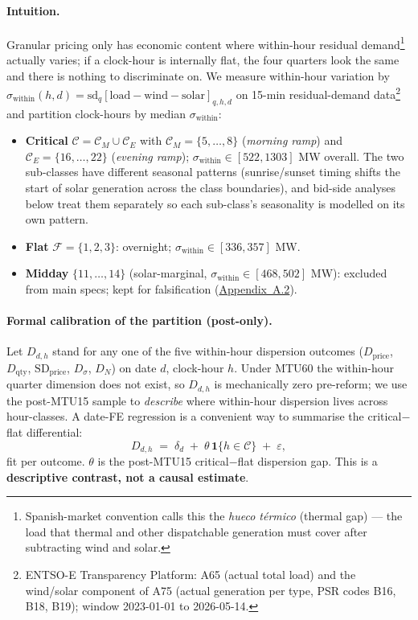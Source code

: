\documentclass[11pt]{article}
\begin{document}
\paragraph{Intuition.} Granular pricing only has economic content where within-hour residual demand\footnote{Spanish-market convention calls this the \emph{hueco t\'ermico} (thermal gap) --- the load that thermal and other dispatchable generation must cover after subtracting wind and solar.} actually varies; if a clock-hour is internally flat, the four quarters look the same and there is nothing to discriminate on. We measure within-hour variation by $\sigma_{\text{within}}(h,d) = \mathrm{sd}_q[\text{load}-\text{wind}-\text{solar}]_{q,h,d}$ on 15-min residual-demand data\footnote{ENTSO-E Transparency Platform: A65 (actual total load) and the wind/solar component of A75 (actual generation per type, PSR codes B16, B18, B19); window 2023-01-01 to 2026-05-14.} and partition clock-hours by median $\sigma_{\text{within}}$:
\begin{itemize}\setlength{\itemsep}{1pt}
\item \textbf{Critical} $\mathcal{C}=\mathcal{C}_M\cup\mathcal{C}_E$ with $\mathcal{C}_M=\{5,\dots,8\}$ (\emph{morning ramp}) and $\mathcal{C}_E=\{16,\dots,22\}$ (\emph{evening ramp}); $\sigma_{\text{within}}\in[522,1303]$ MW overall. The two sub-classes have different seasonal patterns (sunrise/sunset timing shifts the start of solar generation across the class boundaries), and bid-side analyses below treat them separately so each sub-class's seasonality is modelled on its own pattern.
\item \textbf{Flat} $\mathcal{F}=\{1,2,3\}$: overnight; $\sigma_{\text{within}}\in[336,357]$ MW.
\item \textbf{Midday} $\{11,\dots,14\}$ (solar-marginal, $\sigma_{\text{within}}\in[468,502]$ MW): excluded from main specs; kept for falsification (\hyperref[sec:5a]{Appendix~A.2}).
\end{itemize}

\paragraph{Formal calibration of the partition (post-only).} Let $D_{d,h}$ stand for any one of the five within-hour dispersion outcomes ($D_{\text{price}}$, $D_{\text{qty}}$, $\text{SD}_{\text{price}}$, $D_\sigma$, $D_N$) on date $d$, clock-hour $h$. Under MTU60 the within-hour quarter dimension does not exist, so $D_{d,h}$ is mechanically zero pre-reform; we use the post-MTU15 sample to \emph{describe} where within-hour dispersion lives across hour-classes. A date-FE regression is a convenient way to summarise the critical$-$flat differential:
\[
D_{d,h} \;=\; \delta_d \;+\; \theta\,\mathbf{1}\{h\in\mathcal{C}\} \;+\; \varepsilon,
\]
fit per outcome. $\theta$ is the post-MTU15 critical$-$flat dispersion gap. This is a \textbf{descriptive contrast, not a causal estimate}.
\end{document}
